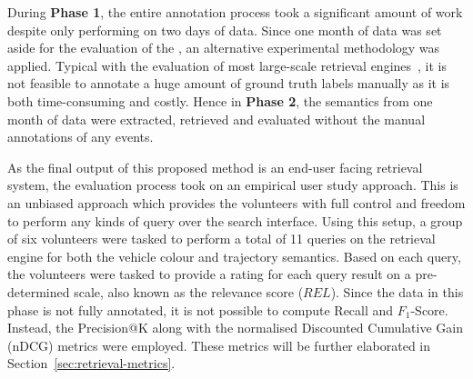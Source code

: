 During \textbf{Phase 1}, the entire annotation process took a significant amount of work despite only performing on two days of data. Since one month of data was set aside for the evaluation of the \versionTwoRet, an alternative experimental methodology was applied.
Typical with the evaluation of most large-scale retrieval engines~\cite{jermsurawong2012car, zhang2013mining, castanon2016retrieval, ren2018learning}, 
it is not feasible to annotate a huge amount of ground truth labels manually as it is both %
time-consuming and costly. 
Hence in \textbf{Phase 2}, the semantics from one month of data were extracted, retrieved and evaluated without the manual annotations of any events.

As the final output of this proposed method is an end-user facing retrieval system, the evaluation process took on an empirical user study approach. This is an unbiased approach which provides the volunteers with full control and freedom to perform any kinds of query over the search interface.
Using this setup, a group of six volunteers were tasked to perform a total of 11 queries on the retrieval engine for both the vehicle colour and trajectory semantics.
Based on each query, the volunteers were tasked to provide a rating for each query result on a pre-determined scale, also known as the relevance score ($REL$).
Since the data in this phase is not fully annotated, it is not possible to compute Recall and $F_1$-Score. Instead, the Precision@K along with the normalised Discounted Cumulative Gain (nDCG) metrics were employed. These metrics will be further elaborated in Section~\ref{sec:retrieval-metrics}.

